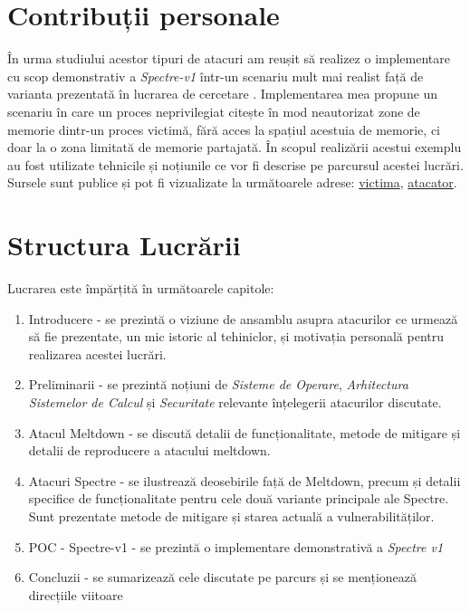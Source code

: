 \section{Contribuții personale}

În urma studiului acestor tipuri de atacuri am reușit să realizez o
implementare cu scop demonstrativ a \emph{Spectre-v1} într-un scenariu mult mai
realist față de varianta prezentată în lucrarea de cercetare
\cite{spectre2019}. Implementarea mea propune un scenariu în care un proces
neprivilegiat citește în mod neautorizat zone de memorie dintr-un proces
victimă, fără acces la spațiul acestuia de memorie, ci doar la o zona limitată
de memorie partajată. În scopul realizării acestui exemplu au fost utilizate
tehnicile și noțiunile ce vor fi descrise pe parcursul acestei lucrări. Sursele sunt
publice și pot fi vizualizate la următoarele adrese:
\href{https://gist.github.com/Stefan-Radu/ca918598c9cce84429f566e020d93d15}{victima},
\href{https://gist.github.com/Stefan-Radu/29732c53a7d552fdec06fb46a801bd51}{atacator}.

\section{Structura Lucrării}

Lucrarea este împărțită în următoarele capitole:

\begin{enumerate}
  \item Introducere - se prezintă o viziune de ansamblu asupra atacurilor ce
    urmează să fie prezentate, un mic istoric al tehiniclor, și motivația
    personală pentru realizarea acestei lucrări.
  \item Preliminarii - se prezintă noțiuni de \emph{Sisteme de Operare},
    \emph{Arhitectura Sistemelor de Calcul} și \emph{Securitate} relevante
    înțelegerii atacurilor discutate.
  \item Atacul Meltdown - se discută detalii de funcționalitate, metode de
    mitigare și detalii de reproducere a atacului meltdown.
  \item Atacuri Spectre - se ilustrează deosebirile față de Meltdown, precum și
    detalii specifice de funcționalitate pentru cele două variante principale
    ale Spectre. Sunt prezentate metode de mitigare și starea actuală a
    vulnerabilităților.
  \item POC - Spectre-v1 - se prezintă o implementare demonstrativă a
    \emph{Spectre v1}
  \item Concluzii - se sumarizează cele discutate pe parcurs și se menționează
    direcțiile viitoare
\end{enumerate}
